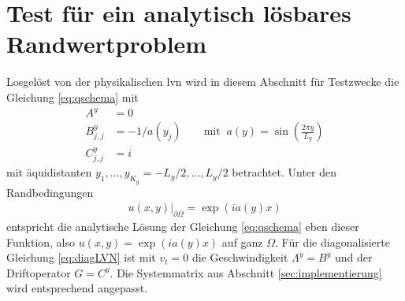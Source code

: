 \section{Test für ein analytisch lösbares Randwertproblem}\label{sec:test}
Losgelöst von der physikalischen \ac{lvn} wird in diesem Abschnitt für Testzwecke die Gleichung \eqref{eq:qschema} mit
\begin{equation*}
  \begin{aligned}
    A^y& = 0 \\
    B^y_{j,j} &= -1/a(y_j) \qquad \text{mit} \;\; a(y)=\sin\left(\frac{2\pi y}{L_y}\right) \\
    C^y_{j,j} &= i
  \end{aligned}
\end{equation*}
mit äquidistanten $y_1,\dots,y_{K_y}=-L_y/2,\dots,L_y/2$ betrachtet. Unter den Randbedingungen
\begin{equation*}
  \begin{aligned}
    u(x,y)|_{\partial \Omega} = \exp(ia(y)x)
  \end{aligned}
\end{equation*}
entspricht die analytische Lösung der Gleichung \eqref{eq:qschema} eben dieser Funktion, also $u(x,y) = \exp(ia(y)x)$ auf ganz $\Omega$. Für die diagonalisierte Gleichung \eqref{eq:diagLVN} ist mit $v_t=0$ die Geschwindigkeit $\Lambda^y=B^y$ und der Driftoperator $G=C^y$. Die Systemmatrix aus Abschnitt \ref{sec:implementierung} wird entsprechend angepasst.

